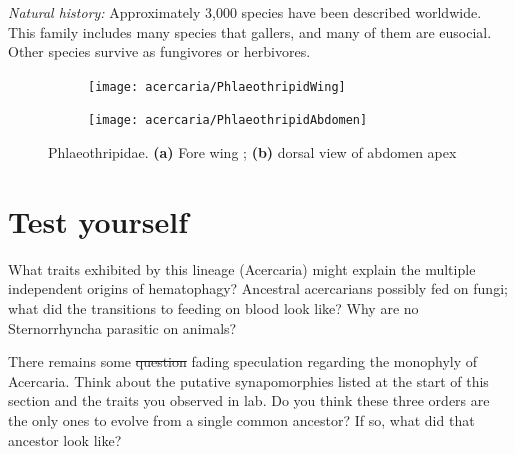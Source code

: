 \noindent{}\textit{Natural history:} Approximately 3,000 species have been described worldwide. This family includes many species that gallers, and many of them are eusocial. Other species survive as fungivores or herbivores.

\begin{figure}[ht!]
 \centering
 \begin{subfigure}[ht!]{0.48\textwidth}
  \texttt{[image: acercaria/PhlaeothripidWing]}
  \caption{}
  \label{fig:phlaeothripid1}
 \end{subfigure}
 \qquad
 \begin{subfigure}[ht!]{0.34\textwidth}
  \texttt{[image: acercaria/PhlaeothripidAbdomen]}
  \caption{}
  \label{fig:phlaeothripid2}
 \end{subfigure}
 \caption{Phlaeothripidae. \textbf{(a)} Fore wing \citep[][Fig. 6]{minaei2013}; \textbf{(b)} dorsal view of abdomen apex \citep[][Fig. 9]{minaei2013}}\label{fig:phlaeothripids}
\end{figure}

\section*{Test yourself}
What traits exhibited by this lineage (Acercaria) might explain the multiple independent origins of hematophagy? Ancestral acercarians possibly fed on fungi; what did the transitions to feeding on blood look like? Why are no Sternorrhyncha parasitic on animals?\vspace{3mm}

\noindent{}There remains some \sout{question} fading speculation regarding the monophyly of Acercaria. Think about the putative synapomorphies listed at the start of this section and the traits you observed in lab. Do you think these three orders are the only ones to evolve from a single common ancestor? If so, what did that ancestor look like?

\clearpage
\thispagestyle{empty}
